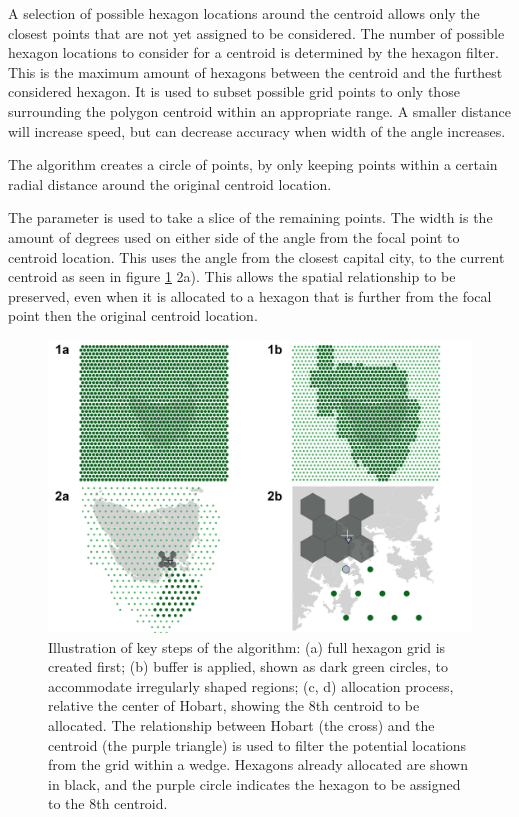 A selection of possible hexagon locations around the centroid allows
only the closest points that are not yet assigned to be considered. The
number of possible hexagon locations to consider for a centroid is
determined by the hexagon filter. This is the maximum amount of hexagons
between the centroid and the furthest considered hexagon. It is used to
subset possible grid points to only those surrounding the polygon
centroid within an appropriate range. A smaller distance will increase
speed, but can decrease accuracy when width of the angle increases.

The algorithm creates a circle of points, by only keeping points within
a certain radial distance around the original centroid location.

The  parameter is used to take a slice of the remaining
points. The width is the amount of degrees used on either side of the
angle from the focal point to centroid location. This uses the angle
from the closest capital city, to the current centroid as seen in figure
\ref{fig:filterprocess} 2a). This allows the spatial relationship to be
preserved, even when it is allocated to a hexagon that is further from
the focal point then the original centroid location.

\begin{Schunk}
\begin{figure}
\includegraphics[width=0.95\linewidth]{kobakian-cook_files/figure-latex/filterprocess-1} \caption[Illustration of key steps of the algorithm]{Illustration of key steps of the algorithm: (a) full hexagon grid is created first; (b) buffer is applied, shown as dark green circles, to accommodate irregularly shaped regions; (c, d) allocation process, relative the center of Hobart, showing the 8th centroid to be allocated. The relationship between Hobart (the cross) and the centroid (the purple triangle) is used to filter the potential locations from the grid within a wedge. Hexagons already allocated are shown in black, and the purple circle indicates the hexagon to be assigned to the 8th centroid.}\label{fig:filterprocess}
\end{figure}
\end{Schunk}

